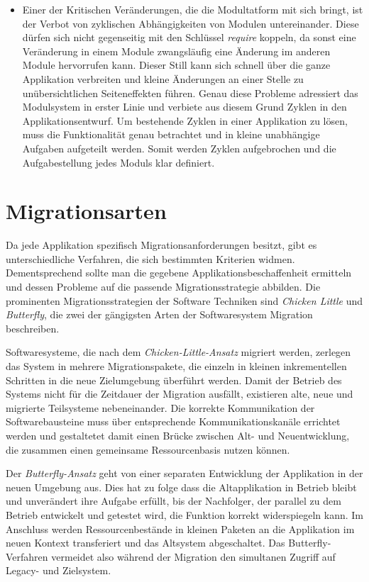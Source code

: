 \begin{itemize}
	\item Einer der Kritischen Veränderungen, die die Modultatform mit sich bringt, ist der Verbot von zyklischen Abhängigkeiten von Modulen untereinander. Diese dürfen sich nicht gegenseitig mit den Schlüssel \textit{require} koppeln, da sonst eine Veränderung in einem Module zwangsläufig eine Änderung im anderen Module hervorrufen kann. Dieser Still kann sich schnell über die ganze Applikation verbreiten und kleine Änderungen an einer Stelle zu unübersichtlichen Seiteneffekten führen. Genau diese Probleme adressiert das Modulsystem in erster Linie und verbiete aus diesem Grund Zyklen in den Applikationsentwurf. Um bestehende Zyklen in einer Applikation zu lösen, muss die Funktionalität genau betrachtet und in kleine unabhängige Aufgaben aufgeteilt werden. Somit werden Zyklen aufgebrochen und die Aufgabestellung jedes Moduls klar definiert. 
\end{itemize}

\section{Migrationsarten} \label{Migratiosarten}

	Da jede Applikation spezifisch Migrationsanforderungen besitzt, gibt es unterschiedliche Verfahren, die sich bestimmten Kriterien widmen. Dementsprechend sollte man die gegebene Applikationsbeschaffenheit ermitteln und dessen Probleme auf die passende Migrationsstrategie abbilden. Die prominenten Migrationsstrategien der Software Techniken sind \textit{Chicken Little} und \textit{Butterfly}, die zwei der gängigsten Arten der Softwaresystem Migration beschreiben.\bigbreak


	Softwaresysteme, die nach dem \textit{Chicken-Little-Ansatz} migriert werden, zerlegen das System in mehrere Migrationspakete, die einzeln in kleinen inkrementellen Schritten in die neue Zielumgebung überführt werden. Damit der Betrieb des Systems nicht für die Zeitdauer der Migration ausfällt, existieren alte, neue und migrierte Teilsysteme nebeneinander. Die korrekte Kommunikation der Softwarebausteine muss über entsprechende Kommunikationskanäle errichtet werden und gestaltetet damit einen Brücke zwischen Alt- und Neuentwicklung, die zusammen einen gemeinsame Ressourcenbasis nutzen können. \bigbreak

	Der \textit{Butterfly-Ansatz} geht von einer separaten Entwicklung der Applikation in der neuen Umgebung aus. Dies hat zu folge dass die Altapplikation in Betrieb bleibt und unverändert ihre Aufgabe erfüllt, bis der Nachfolger, der parallel zu dem Betrieb entwickelt und getestet wird, die Funktion korrekt widerspiegeln kann. Im Anschluss werden Ressourcenbestände in kleinen Paketen an die Applikation im neuen Kontext transferiert und das Altsystem abgeschaltet. Das Butterfly-Verfahren vermeidet also während der Migration den simultanen Zugriff auf Legacy- und Zielsystem. \bigbreak

